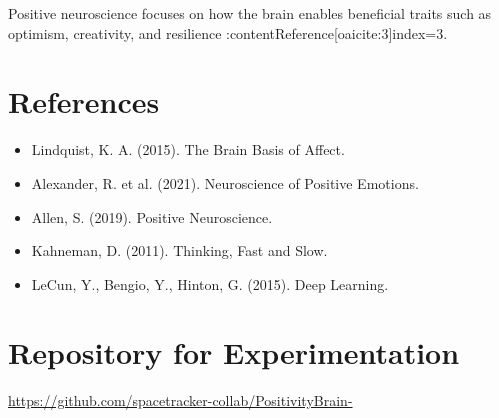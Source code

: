 \documentclass[12pt]{article}
\begin{document}
Positive neuroscience focuses on how the brain enables beneficial traits such as optimism, creativity, and resilience :contentReference[oaicite:3]{index=3}.

\section{References}

\begin{itemize}
\item Lindquist, K. A. (2015). The Brain Basis of Affect.
\item Alexander, R. et al. (2021). Neuroscience of Positive Emotions.
\item Allen, S. (2019). Positive Neuroscience.
\item Kahneman, D. (2011). Thinking, Fast and Slow.
\item LeCun, Y., Bengio, Y., Hinton, G. (2015). Deep Learning.
\end{itemize}

\section{Repository for Experimentation}

\noindent
\url{https://github.com/spacetracker-collab/PositivityBrain-}
\end{document}
